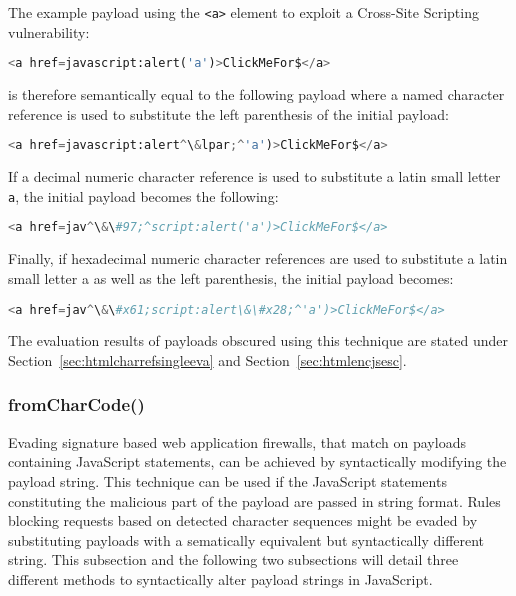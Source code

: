 The example payload using the \verb|<a>| element to exploit a Cross-Site Scripting vulnerability:

\begin{lstlisting}[style=basicStyle, language=Python, escapeinside=\^\^]
<a href=javascript:alert('a')>ClickMeFor$</a>
\end{lstlisting}
is therefore semantically equal to the following payload where a named character reference is used to substitute the left parenthesis of the initial payload:

\begin{lstlisting}[style=basicStyle, language=Python, escapeinside=\^\^]
<a href=javascript:alert^\&lpar;^'a')>ClickMeFor$</a>
\end{lstlisting}

If a decimal numeric character reference is used to substitute a latin small letter \verb|a|, the initial payload becomes the following:

\begin{lstlisting}[style=basicStyle, language=Python, escapeinside=\^\^]
<a href=jav^\&\#97;^script:alert('a')>ClickMeFor$</a>
\end{lstlisting}

Finally, if hexadecimal numeric character references are used to substitute a latin small letter a as well as the left parenthesis, the initial payload becomes:

\begin{lstlisting}[style=basicStyle, language=Python, escapeinside=\^\^]
<a href=jav^\&\#x61;script:alert\&\#x28;^'a')>ClickMeFor$</a>
\end{lstlisting}

The evaluation results of payloads obscured using this technique are stated under Section~\ref{sec:htmlcharrefsingleeva} and Section~\ref{sec:htmlencjsesc}.

\subsubsection{fromCharCode()}
\label{sec:fromcharcodetech}
Evading signature based web application firewalls, that match on payloads containing JavaScript statements, can be achieved by syntactically modifying the payload string. This technique can be used if the JavaScript statements constituting the malicious part of the payload are passed in string format.
Rules blocking requests based on detected character sequences might be evaded by substituting payloads with a sematically equivalent but syntactically different string. This subsection and the following two subsections will detail three different methods to syntactically alter payload strings in JavaScript. \\

